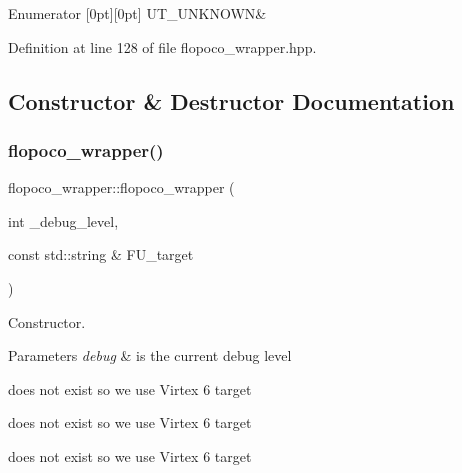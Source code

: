 \begin{DoxyEnumFields}{Enumerator}
[0pt][0pt]{}\mbox{\label{classflopoco__wrapper_a5e24209a3f08ad68bcc6e69ce2924358aef6e995db2f42f7fd6e20041b3d8bd7e}} 
U\+T\+\_\+\+U\+N\+K\+N\+O\+WN&\\
\hline

\end{DoxyEnumFields}


Definition at line 128 of file flopoco\+\_\+wrapper.\+hpp.



\subsection{Constructor \& Destructor Documentation}
\mbox{\label{classflopoco__wrapper_a96975b686fca80c7a78c8e3a3fde4ddc}} 
\subsubsection{\texorpdfstring{flopoco\+\_\+wrapper()}{flopoco\_wrapper()}\hspace{0.1cm}{\footnotesize\ttfamily [1/2]}}
{\footnotesize\ttfamily flopoco\+\_\+wrapper\+::flopoco\+\_\+wrapper (\begin{DoxyParamCaption}\item[{int}]{\+\_\+debug\+\_\+level,  }\item[{const std\+::string \&}]{F\+U\+\_\+target }\end{DoxyParamCaption})}



Constructor. 


\begin{DoxyParams}{Parameters}
{\em debug} & is the current debug level \\
\hline
\end{DoxyParams}
does not exist so we use Virtex 6 target

does not exist so we use Virtex 6 target

does not exist so we use Virtex 6 target

